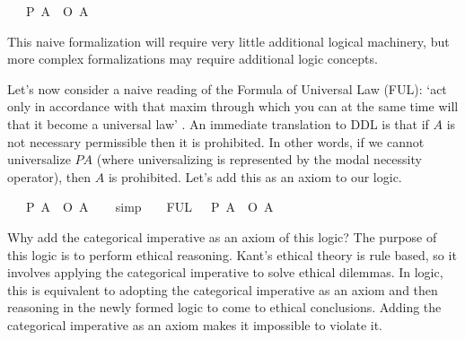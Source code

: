 \begin{isabellebody}
\ \ \ {\isachardoublequoteopen}{\isacharparenleft}P\ A{\isacharparenright}\ {\isasymequiv}\ {\isacharparenleft}\isactrlbold {\isasymnot}{\isacharparenleft}O\ {\isacharbraceleft}\isactrlbold {\isasymnot}A{\isacharbraceright}{\isacharparenright}{\isacharparenright}{\isachardoublequoteclose}\isanewline
%
%
\begin{isamarkuptext}%
This naive formalization will require very little additional logical machinery, but more complex
formalizations may require additional logic concepts. 

Let's now consider a naive reading of the Formula of Universal Law (FUL): `act only in accordance 
with that maxim through which you can at the same time will that it become a universal law' \cite{groundwork}.
An immediate translation to DDL is that if $A$ is not necessary permissible then it is prohibited. In other
words, if we cannot universalize $P A$ (where universalizing is represented by the modal necessity 
operator), then $A$ is prohibited. Let's add this as an axiom to our logic.%
\end{isamarkuptext}\isamarkuptrue%
\isamarkupfalse%
\ {\isachardoublequoteopen}{\isasymTurnstile}\ {\isacharparenleft}{\isacharparenleft}\isactrlbold {\isasymnot}{\isacharparenleft}{\isasymbox}\ {\isacharparenleft}P\ A{\isacharparenright}{\isacharparenright}{\isacharparenright}\ \isactrlbold {\isasymrightarrow}\ {\isacharparenleft}O\ {\isacharbraceleft}{\isacharparenleft}\isactrlbold {\isasymnot}A{\isacharparenright}{\isacharbraceright}{\isacharparenright}{\isacharparenright}{\isachardoublequoteclose}\isanewline
%
\isadelimproof
\ \ %
\endisadelimproof
%
\isatagproof
{}\isamarkupfalse%
\ simp%
\endisatagproof
{\isafoldproof}%
%
\isadelimproof
\isanewline
%
\endisadelimproof
\ \isanewline
\isanewline
{}\isamarkupfalse%
\ \isanewline
FUL{\isacharunderscore}{}{\isacharcolon}\ {\isachardoublequoteopen}{\isasymTurnstile}\ {\isacharparenleft}{\isacharparenleft}\isactrlbold {\isasymnot}{\isacharparenleft}{\isasymbox}\ {\isacharparenleft}P\ A{\isacharparenright}{\isacharparenright}{\isacharparenright}\ \isactrlbold {\isasymrightarrow}\ {\isacharparenleft}O\ {\isacharbraceleft}{\isacharparenleft}\isactrlbold {\isasymnot}A{\isacharparenright}{\isacharbraceright}{\isacharparenright}{\isacharparenright}{\isachardoublequoteclose}%
\begin{isamarkuptext}%
Why add the categorical imperative as an axiom of this logic? The purpose of this logic is to 
perform ethical reasoning. Kant's ethical theory is rule based, so it involves applying the categorical
imperative to solve ethical dilemmas. In logic, this is equivalent to adopting the categorical imperative as 
an axiom and then reasoning in the newly formed logic to come to ethical conclusions. Adding the categorical
imperative as an axiom makes it impossible to violate it. 


\end{isamarkuptext}
\end{isabellebody}
